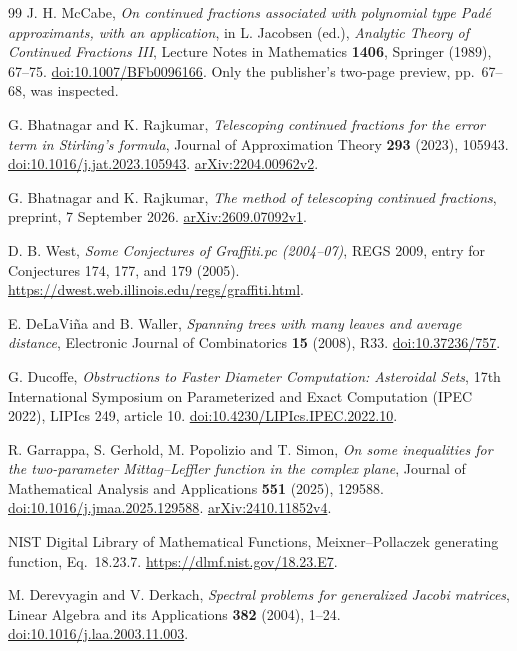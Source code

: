 \documentclass[11pt,a4paper]{article}
\theoremstyle{definition}
\theoremstyle{remark}
\numberwithin{equation}{section}
\begin{document}
\begin{thebibliography}{99}
J. H. McCabe,
\emph{On continued fractions associated with polynomial type Pad\'e
approximants, with an application},
in L. Jacobsen (ed.), \emph{Analytic Theory of Continued Fractions III},
Lecture Notes in Mathematics \textbf{1406}, Springer (1989),
67--75.
\href{https://doi.org/10.1007/BFb0096166}{doi:10.1007/BFb0096166}.
Only the publisher's two-page preview, pp.~67--68, was inspected.


G. Bhatnagar and K. Rajkumar,
\emph{Telescoping continued fractions for the error term in Stirling's
formula}, Journal of Approximation Theory \textbf{293} (2023), 105943.
\href{https://doi.org/10.1016/j.jat.2023.105943}{doi:10.1016/j.jat.2023.105943}.
\href{https://arxiv.org/abs/2204.00962}{arXiv:2204.00962v2}.

G. Bhatnagar and K. Rajkumar,
\emph{The method of telescoping continued fractions},
preprint, 7 September 2026.
\href{https://arxiv.org/abs/2609.07092}{arXiv:2609.07092v1}.

D. B. West,
\emph{Some Conjectures of Graffiti.pc (2004--07)}, REGS 2009,
entry for Conjectures 174, 177, and 179 (2005).
\url{https://dwest.web.illinois.edu/regs/graffiti.html}.

E. DeLaVi\~na and B. Waller,
\emph{Spanning trees with many leaves and average distance},
Electronic Journal of Combinatorics \textbf{15} (2008), R33.
\href{https://doi.org/10.37236/757}{doi:10.37236/757}.

G. Ducoffe,
\emph{Obstructions to Faster Diameter Computation: Asteroidal Sets},
17th International Symposium on Parameterized and Exact Computation
(IPEC 2022), LIPIcs 249, article 10.
\href{https://doi.org/10.4230/LIPIcs.IPEC.2022.10}{doi:10.4230/LIPIcs.IPEC.2022.10}.

R. Garrappa, S. Gerhold, M. Popolizio and T. Simon,
\emph{On some inequalities for the two-parameter Mittag--Leffler
function in the complex plane}, Journal of Mathematical Analysis and
Applications \textbf{551} (2025), 129588.
\href{https://doi.org/10.1016/j.jmaa.2025.129588}{doi:10.1016/j.jmaa.2025.129588}.
\href{https://arxiv.org/abs/2410.11852}{arXiv:2410.11852v4}.

NIST Digital Library of Mathematical Functions,
Meixner--Pollaczek generating function, Eq.~18.23.7.
\url{https://dlmf.nist.gov/18.23.E7}.

M. Derevyagin and V. Derkach,
\emph{Spectral problems for generalized Jacobi matrices},
Linear Algebra and its Applications \textbf{382} (2004), 1--24.
\href{https://doi.org/10.1016/j.laa.2003.11.003}{doi:10.1016/j.laa.2003.11.003}.

\end{thebibliography}
\end{document}
